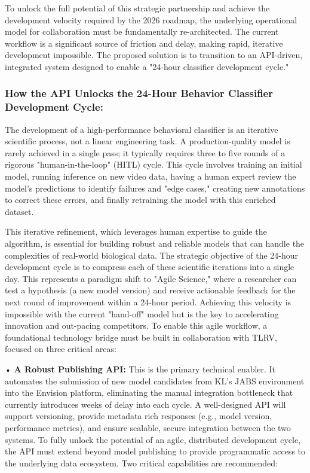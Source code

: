 \documentclass[11pt,onecolumn]{article}
\begin{document}
To unlock the full potential of this strategic partnership and achieve the development velocity required by the 2026 roadmap, the underlying operational model for collaboration must be fundamentally re-architected. The current workflow is a significant source of friction and delay, making rapid, iterative development impossible. The proposed solution is to transition to an API-driven, integrated system designed to enable a "24-hour classifier development cycle."

\subsubsection{How the API Unlocks the 24-Hour Behavior Classifier Development Cycle:}

The development of a high-performance behavioral classifier is an iterative scientific process, not a linear engineering task. A production-quality model is rarely achieved in a single pass; it typically requires three to five rounds of a rigorous "human-in-the-loop" (HITL) cycle. This cycle involves training an initial model, running inference on new video data, having a human expert review the model's predictions to identify failures and "edge cases," creating new annotations to correct these errors, and finally retraining the model with this enriched dataset.

This iterative refinement, which leverages human expertise to guide the algorithm, is essential for building robust and reliable models that can handle the complexities of real-world biological data. The strategic objective of the 24-hour development cycle is to compress each of these scientific iterations into a single day. This represents a paradigm shift to "Agile Science," where a researcher can test a hypothesis (a new model version) and receive actionable feedback for the next round of improvement within a 24-hour period. Achieving this velocity is impossible with the current "hand-off" model but is the key to accelerating innovation and out-pacing competitors. To enable this agile workflow, a foundational technology bridge must be built in collaboration with TLRV, focused on three critical areas:

• \textbf{A Robust Publishing API:} This is the primary technical enabler. It automates the submission of new model candidates from KL's JABS environment into the Envision platform, eliminating the manual integration bottleneck that currently introduces weeks of delay into each cycle. A well-designed API will support versioning, provide metadata rich responses (e.g., model version, performance metrics), and ensure scalable, secure integration between the two systems. To fully unlock the potential of an agile, distributed development cycle, the API must extend beyond model publishing to provide programmatic access to the underlying data ecosystem. Two critical capabilities are recommended:
\end{document}
